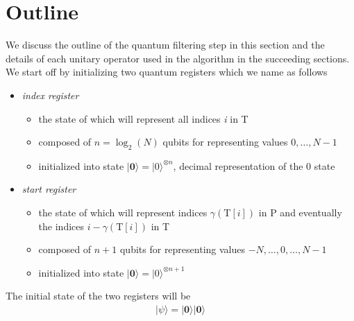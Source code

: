 \section{Outline}
We discuss the outline of the quantum filtering step in this section and the details of each unitary operator used in the algorithm in the succeeding sections. We start off by initializing two quantum registers which we name as follows
\begin{itemize}
	\item \textit{index register}
		\begin{itemize}
			\item the state of which will represent all indices \textit{i} in T
			\item composed of $n=\log_{2}(N)$ qubits for representing values $0,\ldots,N-1$
			\item initialized into state $\vert \mathbf{0} \rangle = \vert 0 \rangle^{\otimes n}$, decimal representation of the 0 state
		\end{itemize}
	\item \textit{start register}
		\begin{itemize}
			\item the state of which will represent indices $\gamma(\text{T}[i])$ in P and eventually the indices $i - \gamma(\text{T}[i])$ in T
			\item composed of $n+1$ qubits for representing values $-N,\ldots,0,\ldots,N-1$
			\item initialized into state $\vert \mathbf{0} \rangle=\vert 0 \rangle^{\otimes n+1}$
		\end{itemize}
\end{itemize}
The initial state of the two registers will be 
\begin{align}
	\label{eqn:zero-state}
	\vert \psi \rangle = \vert \mathbf{0} \rangle\vert \mathbf{0} \rangle
\end{align}


